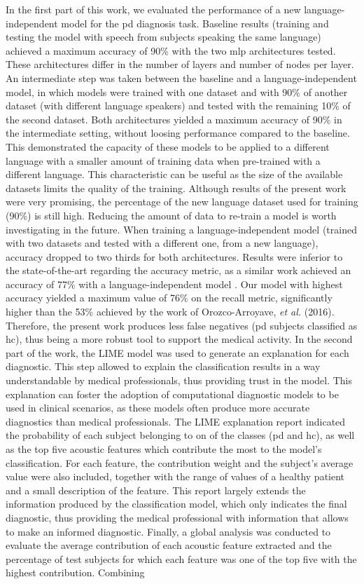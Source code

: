 In the first part of this work, we evaluated the performance of a new language-independent model for the \gls{pd} diagnosis task. Baseline results (training and testing the model with speech from subjects speaking the same language) achieved a maximum accuracy of 90\% with the two \gls{mlp} architectures tested. These architectures differ in the number of layers and number of nodes per layer. An intermediate step was taken between the baseline and a language-independent model, in which models were trained with one dataset and with 90\% of another dataset (with different language speakers) and tested with the remaining 10\% of the second dataset. Both architectures yielded a maximum accuracy of 90\% in the intermediate setting, without loosing performance compared to the baseline. This demonstrated the capacity of these models to be applied to a different language with a smaller amount of training data when pre-trained with a different language. This characteristic can be useful as the size of the available datasets limits the quality of the training. Although results of the present work were very promising, the percentage of the new language dataset used for training (90\%) is still high. Reducing the amount of data to re-train a model is worth investigating in the future. When training a language-independent model (trained with two datasets and tested with a different one, from a new language), accuracy dropped to two thirds for both architectures. Results were inferior to the state-of-the-art regarding the accuracy metric, as a similar work achieved an accuracy of 77\% with a language-independent model \cite{parkinson_three_languages}. Our model with highest accuracy yielded a maximum value of 76\% on the recall metric, significantly higher than the 53\% achieved by the work of Orozco-Arroyave, \textit{et al.} (2016). Therefore, the present work produces less false negatives (\gls{pd} subjects classified as \gls{hc}), thus being a more robust tool to support the medical activity. In the second part of the work, the LIME model was used to generate an explanation for each diagnostic. This step allowed to explain the classification results in a way understandable by medical professionals, thus providing trust in the model. This explanation can foster the adoption of computational diagnostic models to be used in clinical scenarios, as these models often produce more accurate diagnostics than medical professionals. The LIME explanation report indicated the probability of each subject belonging to on of the classes (\gls{pd} and \gls{hc}), as well as the top five acoustic features which contribute the most to the model's classification. For each feature, the contribution weight and the subject's average value were also included, together with the range of values of a healthy patient and a small description of the feature. This report largely extends the information produced by the classification model, which only indicates the final diagnostic, thus providing the medical professional with information that allows to make an informed diagnostic. Finally, a global analysis was conducted to evaluate the average contribution of each acoustic feature extracted and the percentage of test subjects for which each feature was one of the top five with the highest contribution. Combining 